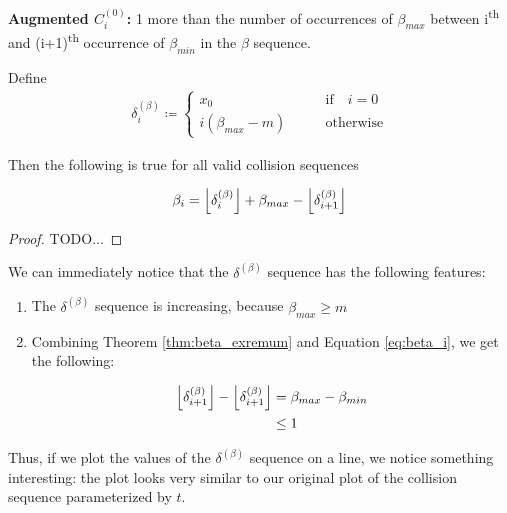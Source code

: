 \begin{definition}
	\textbf{Augmented $C^{(0)}_i$:} 1 more than the number of occurrences of $\beta_{max}$ between i\textsuperscript{th} and (i+1)\textsuperscript{th} occurrence of $\beta_{min}$ in the $\beta$ sequence.
\end{definition}

\begin{theorem}\label{thm:beta_i}
	Define 
	\begin{align}\label{delta_beta}
			\delta^{(\beta)}_i \coloneqq \begin{cases}
				x_0 \qquad &\text{if} \quad i = 0\\
				i (\beta_{max} - m) \qquad &\text{otherwise}
			\end{cases}
	\end{align}

	Then the following is true for all valid collision sequences

	\begin{align}\label{eq:beta_i}
		\beta_i = \floor{\delta^{(\beta)}_i} + \beta_{max} - \floor{\delta^{(\beta)}_{i+1}}
	\end{align}
\end{theorem}

\begin{proof}
	TODO...
\end{proof}

We can immediately notice that the $\delta^{(\beta)}$ sequence has the following features:

\begin{enumerate}
	\item The $\delta^{(\beta)}$ sequence is increasing, because $\beta_{max} \ge m$
	\item Combining Theorem \ref{thm:beta_exremum} and Equation \ref{eq:beta_i}, we get the following:

		\begin{align}
			\floor{\delta^{(\beta)}_{i+1}} - \floor{\delta^{(\beta)}_{i+1}}& = \beta_{max} - \beta_{min}\\
			& \le 1
		\end{align}
\end{enumerate}

Thus, if we plot the values of the $\delta^{(\beta)}$ sequence on a line, we notice something interesting: the plot looks very similar to our original plot of the collision sequence parameterized by $t$. 

